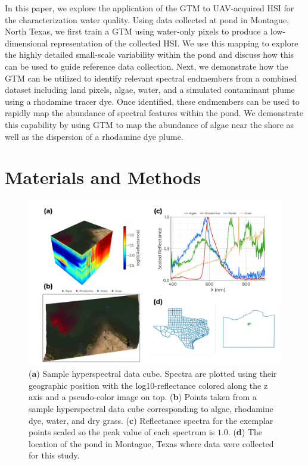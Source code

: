 \documentclass[remotesensing,article,submit,pdftex,moreauthors]{Definitions/mdpi}
\begin{document}
In this paper, we explore the application of the GTM to UAV-acquired HSI for the characterization water quality. Using data collected at pond in Montague, North Texas, we first train a GTM using water-only pixels to produce a low-dimensional representation of the collected HSI. We use this mapping to explore the highly detailed small-scale variability within the pond and discuss how this can be used to guide reference data collection. Next, we demonstrate how the GTM can be utilized to identify relevant spectral endmembers from a combined dataset including land pixels, algae, water, and a simulated contaminant plume using a rhodamine tracer dye. Once identified, these endmembers can be used to rapidly map the abundance of spectral features within the pond. We demonstrate this capability by using GTM to map the abundance of algae near the shore as well as the dispersion of a rhodamine dye plume. 



\section{Materials and Methods}


\begin{figure}[t]
\centering
\includegraphics[width=\columnwidth]{paper/figures/methods/sample-spectra.pdf}
\caption{(\textbf{a}) Sample hyperspectral data cube. Spectra are plotted using their geographic position with the log10-reflectance colored along the z axis and a pseudo-color image on top. (\textbf{b}) Points taken from a sample hyperspectral data cube corresponding to algae, rhodamine dye, water, and dry grass. (\textbf{c}) Reflectance spectra for the exemplar points scaled so the peak value of each spectrum is $1.0$. (\textbf{d}) The location of the pond in Montague, Texas where data were collected for this study.\label{fig:sample-spectra}}
\end{figure}  
\end{document}
